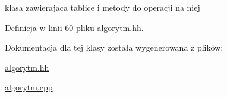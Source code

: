 klasa zawierajaca tablice i metody do operacji na niej 



\-Definicja w linii 60 pliku algorytm.\-hh.



\-Dokumentacja dla tej klasy została wygenerowana z plików\-:\begin{DoxyCompactItemize}
\item 
\hyperlink{algorytm_8hh}{algorytm.\-hh}\item 
\hyperlink{algorytm_8cpp}{algorytm.\-cpp}\end{DoxyCompactItemize}
